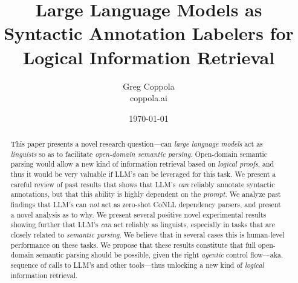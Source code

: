 \documentclass[11pt]{article}
\title{Large Language Models as Syntactic Annotation Labelers for Logical Information Retrieval}
\author{Greg Coppola\\coppola.ai}
\date{\today}
\begin{document}
\maketitle

\begin{abstract}
    This paper presents a novel research question---can {\em large language models} act as {\em linguists} so as to facilitate {\em open-domain semantic parsing}.
    Open-domain semantic parsing would allow a new kind of information retrieval based on {\em logical proofs}, and thus it would be very valuable if LLM's can be leveraged for this task.
    We present a careful review of past results that shows that LLM's {\em can} reliably annotate syntactic annotations, but that this ability is highly dependent on the {\em prompt}.
    We analyze past findings that LLM's can {\em not} act as zero-shot CoNLL dependency parsers, and present a novel analysis as to why.
    We present several positive novel experimental results showing further that LLM's {\em can} act reliably as linguists, especially in tasks that are closely related to {\em semantic parsing}.
    We believe that in several cases this is human-level performance on these tasks.
    We propose that these results constitute that full open-domain semantic parsing should be possible, given the right {\em agentic} control flow---aka. sequence of calls to LLM's and other tools---thus unlocking a new kind of {\em logical} information retrieval.
\end{abstract}
\end{document}
